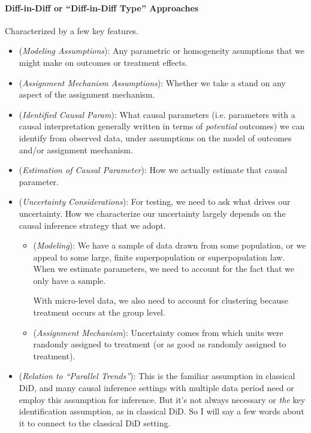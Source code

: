 \documentclass[12pt]{article}
\theoremstyle{plain}
\theoremstyle{definition}
\theoremstyle{remark}
\begin{document}
\paragraph{%
  Diff-in-Diff or ``Diff-in-Diff Type'' Approaches
}
Characterized by a few key features.
\begin{itemize}
  \item
    (\emph{Modeling Assumptions}):
    Any parametric or homogeneity asumptions that we might make on
    outcomes or treatment effects.

  \item
    (\emph{Assignment Mechanism Assumptions}):
    Whether we take a stand on any aspect of the assignment mechanism.


  \item
    (\emph{Identified Causal Param}):
    What causal parameters (i.e. parameters with a causal interpretation
    generally written in terms of \emph{potential} outcomes) we can
    identify from observed data, under assumptions on the model of
    outcomes and/or assignment mechanism.

  \item
    (\emph{Estimation of Causal Parameter}):
    How we actually estimate that causal parameter.

  \item
    (\emph{Uncertainty Considerations}):
    For testing, we need to ask what drives our uncertainty.
    How we characterize our uncertainty largely depends on the causal
    inference strategy that we adopt.
    \begin{itemize}
      \item (\emph{Modeling}):
        We have a sample of data drawn from some population, or we
        appeal to some large, finite superpopulation or superpopulation
        law.
        When we estimate parameters, we need to account for the fact
        that we only have a sample.

        With micro-level data, we also need to account for clustering
        because treatment occurs at the group level.

      \item (\emph{Assignment Mechanism}):
        Uncertainty comes from which units were randomly assigned to
        treatment (or as good as randomly assigned to treatment).
    \end{itemize}

  \item
    (\emph{Relation to ``Parallel Trends''}):
    This is the familiar assumption in classical DiD, and many causal
    inference settings with multiple data period need or employ this
    assumption for inference.
    But it's not always necessary or \emph{the} key identification
    assumption, as in classical DiD.
    So I will say a few words about it to connect to the classical DiD
    setting.


\end{itemize}
\end{document}
